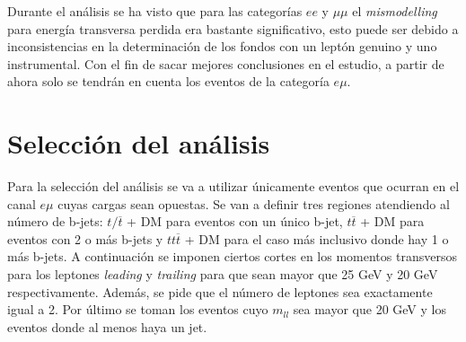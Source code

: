 Durante el análisis se ha visto que para las categorías $ee$ y $\mu\mu$ el \textit{mismodelling} para energía transversa perdida era bastante significativo, esto puede ser debido a inconsistencias en la determinación de los fondos con un leptón genuino y uno instrumental. Con el fin de sacar mejores conclusiones en el estudio, a partir de ahora solo se tendrán en cuenta los eventos de la categoría $e \mu$.\\


\section{Selección del análisis}

Para la selección del análisis se va a utilizar únicamente eventos que ocurran en el canal $e\mu$ cuyas cargas sean opuestas. Se van a definir tres regiones atendiendo al número de b-jets: $t/\overline{t}$ + DM para eventos con un único b-jet, $t\overline{t}$ + DM para eventos con 2 o más b-jets y $tt\overline{t}$ + DM para el caso más inclusivo donde hay 1 o más b-jets.  A continuación se imponen ciertos cortes en los momentos transversos para los leptones \textit{leading} y \textit{trailing} para que sean mayor que 25 GeV y 20 GeV respectivamente. Además, se pide que el número de leptones sea exactamente igual a 2. Por último se toman los eventos cuyo $m_{ll}$ sea mayor que 20 GeV y los eventos donde al menos haya un jet.\newpage

